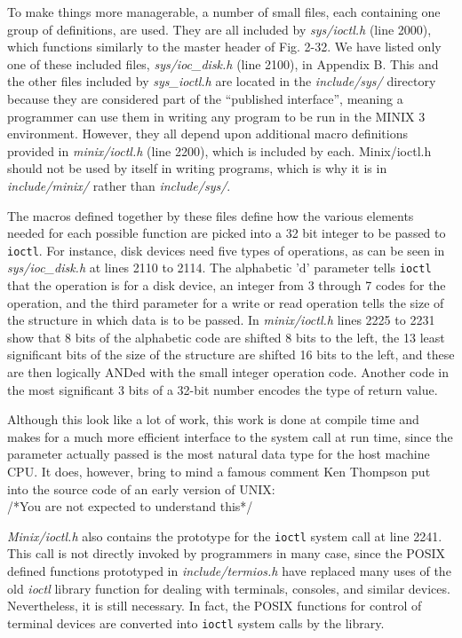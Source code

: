 \documentclass{book}
\newcommand {\sys} [1] {\textsl{#1}}
\newcommand {\cmd} [1] {\texttt{#1}}
\begin{document}
To make things more managerable, a number of small files, each containing one group of definitions, are used.
They are all included by \sys{sys/ioctl.h} (line 2000), which functions similarly to the master header of Fig. 2-32.
We have listed only one of these included files, \sys{sys/ioc\_disk.h} (line 2100), in Appendix B.
This and the other files included by \sys{sys\_ioctl.h} are located in the \sys{include/sys/} directory
because they are considered part of the ``published interface'',
meaning a programmer can use them in writing any program to be run in the MINIX 3 environment.
However, they all depend upon additional macro definitions provided in \sys{minix/ioctl.h} (line 2200), which is included by each.
Minix/ioctl.h should not be used by itself in writing programs,
which is why it is in \sys{include/minix/} rather than \sys{include/sys/}.

The macros defined together by these files define 
how the various elements needed for each possible function are picked into a 32 bit integer to be passed to \cmd{ioctl}.
For instance, disk devices need five types of operations, as can be seen in \sys{sys/ioc\_disk.h} at lines 2110 to 2114.
The alphabetic 'd' parameter tells \cmd{ioctl} that the operation is for a disk device,
an integer from 3 through 7 codes for the operation,
and the third parameter for a write or read operation tells the size of the structure in which data is to be passed.
In \sys{minix/ioctl.h} lines 2225 to 2231 show that 8 bits of the alphabetic code are shifted 8 bits to the left,
the 13 least significant bits of the size of the structure are shifted 16 bits to the left,
and these are then logically ANDed with the small integer operation code.
Another code in the most significant 3 bits of a 32-bit number encodes the type of return value.

Although this look like a lot of work,
this work is done at compile time and makes for a much more efficient interface to the system call at run time,
since the parameter actually passed is the most natural data type for the host machine CPU.
It does, however, bring to mind a famous comment Ken Thompson put into the source code of an early version of UNIX:\\
/*You are not expected to understand this*/

\sys{Minix/ioctl.h} also contains the prototype for the \cmd{ioctl} system call at line 2241.
This call is not directly invoked by programmers in many case,
since the POSIX defined functions prototyped in \sys{include/termios.h} 
have replaced many uses of the old \sys{ioctl} library function for dealing with terminals, consoles, and similar devices.
Nevertheless, it is still necessary.
In fact, the POSIX functions for control of terminal devices are converted into \cmd{ioctl} system calls by the library.


 






























\end{document}

